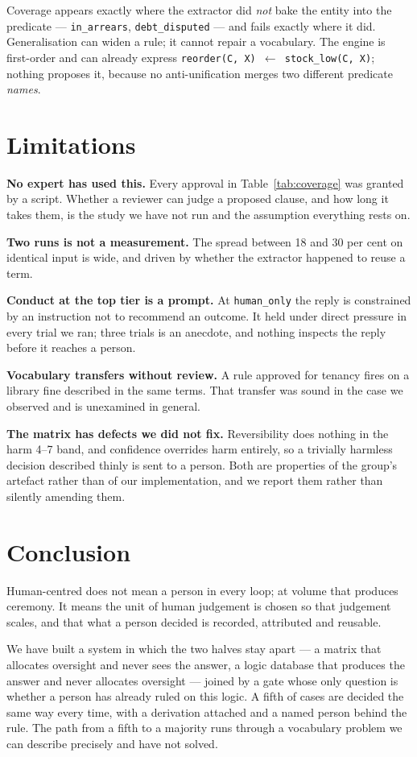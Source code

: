 \documentclass[sigconf,nonacm]{acmart}
\begin{document}
Coverage appears exactly where the extractor did \emph{not} bake the entity into
the predicate --- \texttt{in\_arrears}, \texttt{debt\_disputed} --- and fails
exactly where it did. Generalisation can widen a rule; it cannot repair a
vocabulary. The engine is first-order and can already express
\texttt{reorder(C, X) $\leftarrow$ stock\_low(C, X)}; nothing proposes it,
because no anti-unification merges two different predicate \emph{names}.

\section{Limitations}

\textbf{No expert has used this.} Every approval in Table~\ref{tab:coverage} was
granted by a script. Whether a reviewer can judge a proposed clause, and how long
it takes them, is the study we have not run and the assumption everything rests
on.

\textbf{Two runs is not a measurement.} The spread between 18 and 30 per cent on
identical input is wide, and driven by whether the extractor happened to reuse a
term.

\textbf{Conduct at the top tier is a prompt.} At \texttt{human\_only} the reply
is constrained by an instruction not to recommend an outcome. It held under
direct pressure in every trial we ran; three trials is an anecdote, and nothing
inspects the reply before it reaches a person.

\textbf{Vocabulary transfers without review.} A rule approved for tenancy fires
on a library fine described in the same terms. That transfer was sound in the
case we observed and is unexamined in general.

\textbf{The matrix has defects we did not fix.} Reversibility does nothing in
the harm 4--7 band, and confidence overrides harm entirely, so a trivially
harmless decision described thinly is sent to a person. Both are properties of
the group's artefact rather than of our implementation, and we report them
rather than silently amending them.

\section{Conclusion}

Human-centred does not mean a person in every loop; at volume that produces
ceremony. It means the unit of human judgement is chosen so that judgement
scales, and that what a person decided is recorded, attributed and reusable.

We have built a system in which the two halves stay apart --- a matrix that
allocates oversight and never sees the answer, a logic database that produces
the answer and never allocates oversight --- joined by a gate whose only
question is whether a person has already ruled on this logic. A fifth of cases
are decided the same way every time, with a derivation attached and a named
person behind the rule. The path from a fifth to a majority runs through a
vocabulary problem we can describe precisely and have not solved.
\end{document}
